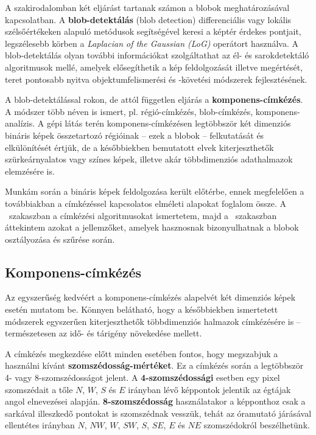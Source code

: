 A szakirodalomban két eljárást tartanak számon a blobok meghatározásával kapcsolatban. A \textbf{blob-detektálás} (blob detection) differenciális vagy lokális szélsőértékeken alapuló metódusok segítségével keresi a képtér érdekes pontjait, legszélesebb körben a \emph{Laplacian of the Gaussian (LoG)} operátort használva. A blob-detektálás olyan további információkat szolgáltathat az él- és sarokdetektáló algoritmusok mellé, amelyek elősegíthetik a kép feldolgozását illetve megértését, teret pontosabb nyitva objektumfelismerési és -követési módszerek fejlesztésének.

A blob-detektálással rokon, de attól független eljárás a \textbf{komponens-címkézés}. A módszer több néven is ismert, pl. régió-címkézés, blob-címkézés, komponens-analízis. A gépi látás terén komponens-címkézésen legtöbbször két dimenziós bináris képek összetartozó régióinak -- ezek a blobok -- felkutatását és elkülönítését értjük, de a későbbiekben bemutatott elvek kiterjeszthetők szürkeárnyalatos vagy színes képek, illetve akár többdimenziós adathalmazok elemzésére is.

\bigskip

Munkám során a bináris képek feldolgozása került előtérbe, ennek megfelelően a továbbiakban a címkézéssel kapcsolatos elméleti alapokat foglalom össze. A ~szakaszban a címkézési algoritmusokat ismertetem, majd a ~szakaszban áttekintem azokat a jellemzőket, amelyek hasznosnak bizonyulhatnak a blobok osztályozása és szűrése során.

\subsection{Komponens-címkézés}\label{sect:blob_cimke}

Az egyszerűség kedvéért a komponens-címkézés alapelvét két dimenziós képek esetén mutatom be. Könnyen belátható, hogy a későbbiekben ismertetett módszerek egyszerűen kiterjeszthetők többdimenziós halmazok címkézésére is -- természetesen az idő- és tárigény növekedése mellett.

\bigskip

A címkézés megkezdése előtt minden esetében fontos, hogy megszabjuk a használni kívánt \textbf{szomszédosság-mértéket}. Ez a címkézés során a legtöbbször 4- vagy 8-szomszédosságot jelent. A \textbf{4-szomszédossági} esetben egy pixel szomszédait a tőle $N$, $W$, $S$ és $E$ irányban lévő képpontok jelentik az égtájak angol elnevezései alapján. \textbf{8-szomszédosság} használatakor a képponthoz csak a sarkával illeszkedő pontokat is szomszédnak vesszük, tehát az óramutató járásával ellentétes irányban $N$, $NW$, $W$, $SW$, $S$, $SE$, $E$ és $NE$ szomszédokról beszélhetünk.

